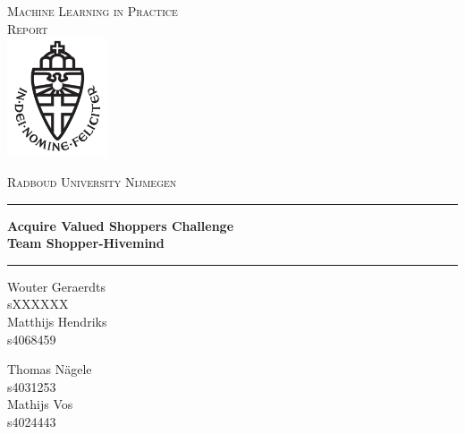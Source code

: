 \documentclass[a4paper]{article}
\begin{document}
\begin{titlepage}
	\begin{center}
	\textsc{\LARGE Machine Learning in Practice\\}
	\textsc{\Large Report}\\[1.5cm]
	\includegraphics[height=100pt]{logo}
   
	\vspace{0.4cm}
	\textsc{\Large Radboud University Nijmegen}\\[.5cm]
	\hrule
	\vspace{0.4cm}
	\textbf{\huge Acquire Valued Shoppers Challenge}\\[0.4cm]
	\textbf{\huge Team Shopper-Hivemind}\\[0.4cm]
	\hrule
	\vspace{1cm}
	\begin{minipage}[t]{0.45\textwidth}
	\begin{flushleft} \large
	Wouter Geraerdts\\
	sXXXXXX\\[0.7cm]
	Matthijs Hendriks\\
	s4068459\\[0.7cm]
	\end{flushleft}
	\end{minipage}
	\begin{minipage}[t]{0.45\textwidth}
	\begin{flushright} \large
	Thomas N\"agele\\
	s4031253\\[0.7cm]
	Mathijs Vos\\
	s4024443\\[0.7cm]
	\end{flushright}
	\end{minipage}
	\vspace{.7cm}
	

\end{center}
\end{titlepage}
\end{document}
